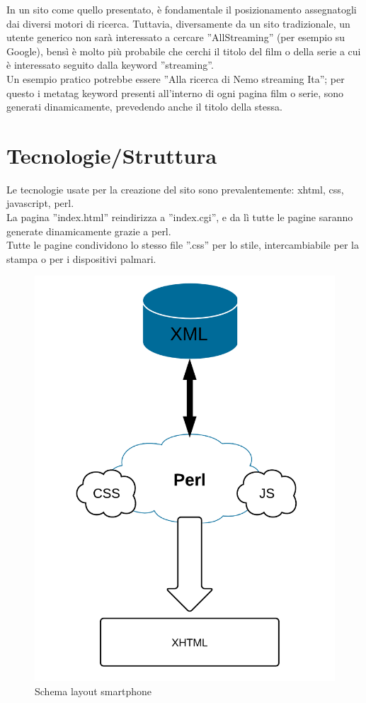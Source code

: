 In un sito come quello presentato, è fondamentale il posizionamento assegnatogli dai diversi motori di ricerca. Tuttavia, diversamente da un sito tradizionale, un utente generico non sarà interessato a cercare ''AllStreaming'' (per esempio su Google), bensì è molto più probabile che cerchi il titolo del film o della serie a cui è interessato seguito dalla keyword ''streaming''.\\ 
Un esempio pratico potrebbe essere ''Alla ricerca di Nemo streaming Ita''; per questo i metatag keyword presenti all'interno di ogni pagina film o serie, sono generati dinamicamente, prevedendo anche il titolo della stessa.

\section{Tecnologie/Struttura }
Le tecnologie usate per la creazione del sito sono prevalentemente: xhtml, css, javascript, perl. \\
La pagina ''index.html'' reindirizza a ''index.cgi'', e da lì tutte le pagine saranno generate dinamicamente grazie a perl.\\
Tutte le pagine condividono lo stesso file ''.css'' per lo stile, intercambiabile per la stampa o per i dispositivi palmari.

\begin{center}
\begin{figure}[H]
\centering
\includegraphics[scale=0.55]{images/struttura.png}
\caption{Schema layout smartphone}
\end{figure}
\end{center}

